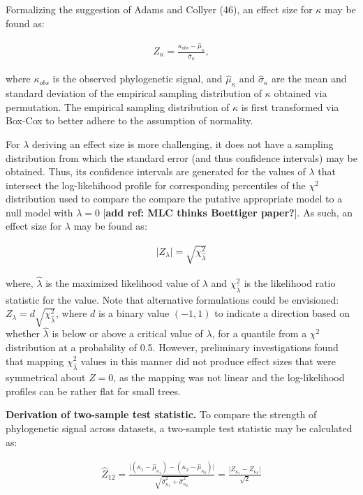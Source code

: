 \documentclass[9pt,twocolumn,twoside,lineno]{pnas-new}
\begin{document}
Formalizing the suggestion of Adams and Collyer (46), an effect size for
\(\kappa\) may be found as:

\begin{align}
    Z_\kappa=\frac{\kappa_{obs}-\hat\mu_{\kappa}}{\hat\sigma_{\kappa}},
\end{align}

where \(\kappa_{obs}\) is the observed phylogenetic signal, and
\(\hat\mu_\kappa\) and \(\hat\sigma_\kappa\) are the mean and standard
deviation of the empirical sampling distribution of \(\kappa\) obtained
via permutation. The empirical sampling distribution of \(\kappa\) is
first transformed via Box-Cox to better adhere to the assumption of
normality. \hfill\break

For \(\lambda\) deriving an effect size is more challenging, it does not
have a sampling distribution from which the standard error (and thus
confidence intervals) may be obtained. Thus, its confidence intervals
are generated for the values of \(\lambda\) that intersect the
log-likehihood profile for corresponding percentiles of the \(\chi^2\)
distribution used to compare the compare the putative appropriate model
to a null model with \(\lambda = 0\) {[}\textbf{add ref: MLC thinks
Boettiger paper?}{]}. As such, an effect size for \(\lambda\) may be
found as:

\begin{align}
   \lvert Z_{\lambda} \rvert = \sqrt{\chi^2_{\hat{\lambda}}}
\end{align}

where, \(\hat{\lambda}\) is the maximized likelihood value of
\(\lambda\) and \(\chi^{2}_{\hat{\lambda}}\) is the likelihood ratio
statistic for the value. Note that alternative formulations could be
envisioned: \(Z_{\lambda} = d \sqrt{\chi^2_{\hat{\lambda}}}\), where
\(d\) is a binary value \((-1,1)\) to indicate a direction based on
whether \(\hat{\lambda}\) is below or above a critical value of
\(\lambda\), for a quantile from a \(\chi^{2}\) distribution at a
probability of 0.5. However, preliminary investigations found that
mapping \(\chi^2_{\hat{\lambda}}\) values in this manner did not produce
effect sizes that were symmetrical about \(Z = 0\), as the mapping was
not linear and the log-likelihood profiles can be rather flat for small
trees.

\textbf{Derivation of two-sample test statistic.} To compare the
strength of phylogenetic signal across datasets, a two-sample test
statistic may be calculated as:

\begin{align}
  \hat{Z}_{12}=\frac{\lvert{(\kappa_{1}-\hat\mu_{\kappa_1})-(\kappa_{2}-\hat\mu_{\kappa_2})}\rvert}{\sqrt{\hat\sigma^2_{\kappa_1}+\hat\sigma^2_{\kappa_2}}} = \frac{\lvert Z_{\kappa_1} - Z_{\kappa_2}\rvert}{\sqrt{2}}
\end{align}
\end{document}
